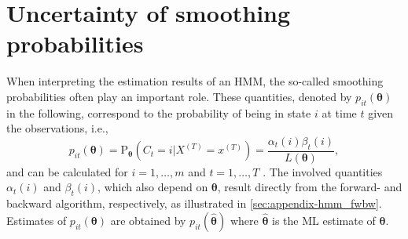 \documentclass[]{interact}\usepackage[]{graphicx}\usepackage[dvipsnames]{xcolor}
\theoremstyle{plain}%
\theoremstyle{definition}
\theoremstyle{remark}
\begin{document}
\section{Uncertainty of smoothing probabilities}
\label{sec:smoothing-uncertainty}

When interpreting the estimation results of an HMM, the so-called smoothing probabilities often play an important role.
These quantities, denoted by $p_{it}(\bm{\theta})$ in the following, correspond to the probability of being in state $i$ at time $t$ given the observations, i.e., 
\begin{equation*}
\label{eq:sm_prob}
  p_{it}(\bm{\theta}) = \text{P}_{\bm{\theta}}(C_t = i \vert X^{(T)} = x^{(T)}) = \frac{\alpha_t(i) \beta_t(i)}{L(\bm{\theta})},
\end{equation*}
and can be calculated for $i=1, \ldots, m$ and $t=1, \ldots, T$ \citep[see, e.g.,][p.~87]{zucchini}. The involved quantities $\alpha_t(i)$ and $\beta_t(i)$, which also depend on $\bm{\theta}$, result directly from the forward- and backward algorithm, respectively, as illustrated in \autoref{sec:appendix-hmm_fwbw}.
Estimates of $p_{it}(\bm{\theta})$ are obtained by $p_{it}(\hat{\bm{\theta}})$ where $\hat{\bm{\theta}}$ is the ML estimate of $\bm{\theta}$.
\end{document}
